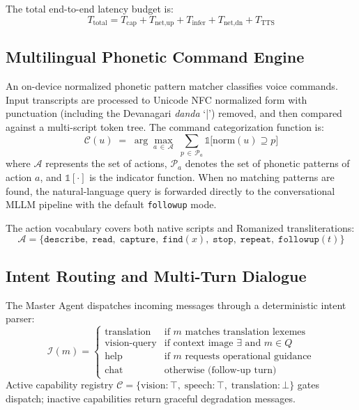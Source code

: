 \documentclass[pdflatex,sn-mathphys-num]{sn-jnl}
\theoremstyle{thmstyleone}%
\theoremstyle{thmstyletwo}%
\theoremstyle{thmstylethree}%
\begin{document}
The total end-to-end latency budget is:
\begin{equation}
  T_{\text{total}} = T_{\text{cap}} + T_{\text{net,up}} + T_{\text{infer}} +
                     T_{\text{net,dn}} + T_{\text{TTS}}
\end{equation}

\subsection{Multilingual Phonetic Command Engine}

An on-device normalized phonetic pattern matcher classifies voice commands.
Input transcripts are processed to Unicode NFC normalized form with punctuation
(including the Devanagari \textit{danda} `|') removed, and then compared against a
multi-script token tree. The command categorization function is:
\begin{equation}
  \mathcal{C}(u) \;=\;
  \arg\max_{a\,\in\,\mathcal{A}}\;
  \sum_{p\,\in\,\mathcal{P}_a} \mathbb{1}\bigl[\text{norm}(u) \supseteq p\bigr]
\end{equation}
where $\mathcal{A}$ represents the set of actions, $\mathcal{P}_a$ denotes the set of
phonetic patterns of action $a$, and $\mathbb{1}[\cdot]$ is the indicator function.
When no matching patterns are found, the natural-language query is forwarded directly to
the conversational MLLM pipeline with the default \texttt{followup} mode.

The action vocabulary covers both native scripts and Romanized transliterations:
\begin{equation}
  \mathcal{A} = \{
    \texttt{describe},\;
    \texttt{read},\;
    \texttt{capture},\;
    \texttt{find}(x),\;
    \texttt{stop},\;
    \texttt{repeat},\;
    \texttt{followup}(t)
  \}
\end{equation}

\subsection{Intent Routing and Multi-Turn Dialogue}

The Master Agent dispatches incoming messages through a deterministic intent
parser:
\begin{equation}
  \mathcal{I}(m) = \begin{cases}
    \text{translation} & \text{if } m \text{ matches translation lexemes} \\
    \text{vision-query} & \text{if context image } \exists \text{ and } m \in Q \\
    \text{help} & \text{if } m \text{ requests operational guidance} \\
    \text{chat} & \text{otherwise (follow-up turn)}
  \end{cases}
\end{equation}
Active capability registry $\mathcal{C} = \{
\text{vision}: \top,\;\text{speech}: \top,\;\text{translation}: \bot\}$ gates
dispatch; inactive capabilities return graceful degradation messages.
\end{document}
